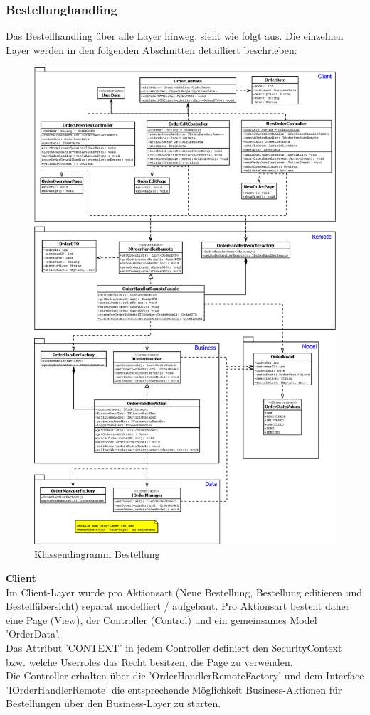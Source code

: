 \subsubsection{Bestellunghandling}
Das Bestellhandling über alle Layer hinweg, sieht wie folgt aus. Die einzelnen Layer werden in den folgenden Abschnitten detailliert beschrieben:
\begin{figure}[H]
	\centering
	\includegraphics[width=0.68\linewidth]{Images/Class-Order}
	\caption{Klassendiagramm Bestellung}
	\label{fig:class-order}
\end{figure}
\clearpage
\textbf{Client}\\
Im Client-Layer wurde pro Aktionsart (Neue Bestellung, Bestellung editieren und Bestellübersicht) separat modelliert / aufgebaut. Pro Aktionsart besteht daher eine Page (View), der Controller (Control) und ein gemeinsames Model 'OrderData'.\\
Das Attribut 'CONTEXT' in jedem Controller definiert den SecurityContext bzw. welche Userroles das Recht besitzen, die Page zu verwenden.\\
Die Controller erhalten über die 'OrderHandlerRemoteFactory' und dem Interface 'IOrderHandlerRemote' die entsprechende Möglichkeit Business-Aktionen für Bestellungen über den Business-Layer zu starten.
